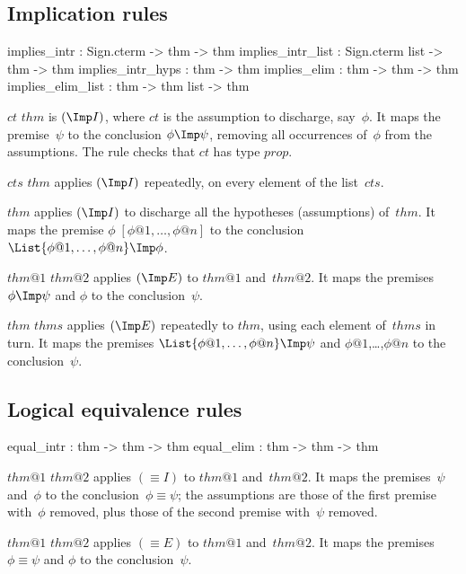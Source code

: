 \subsection{Implication rules}
\begin{ttbox} 
implies_intr      : Sign.cterm -> thm -> thm
implies_intr_list : Sign.cterm list -> thm -> thm
implies_intr_hyps : thm -> thm
implies_elim      : thm -> thm -> thm
implies_elim_list : thm -> thm list -> thm
\end{ttbox}
\begin{ttdescription}
\item[\ttindexbold{implies_intr} $ct$ $thm$] 
is $({\Imp}I)$, where $ct$ is the assumption to discharge, say~$\phi$.  It
maps the premise~$\psi$ to the conclusion $\phi\Imp\psi$, removing all
occurrences of~$\phi$ from the assumptions.  The rule checks that $ct$ has
type $prop$. 

\item[\ttindexbold{implies_intr_list} $cts$ $thm$] 
applies $({\Imp}I)$ repeatedly, on every element of the list~$cts$.

\item[\ttindexbold{implies_intr_hyps} $thm$] 
applies $({\Imp}I)$ to discharge all the hypotheses (assumptions) of~$thm$.
It maps the premise $\phi \; [\phi@1,\ldots,\phi@n]$ to the conclusion
$\List{\phi@1,\ldots,\phi@n}\Imp\phi$.

\item[\ttindexbold{implies_elim} $thm@1$ $thm@2$] 
applies $({\Imp}E)$ to $thm@1$ and~$thm@2$.  It maps the premises $\phi\Imp
\psi$ and $\phi$ to the conclusion~$\psi$.

\item[\ttindexbold{implies_elim_list} $thm$ $thms$] 
applies $({\Imp}E)$ repeatedly to $thm$, using each element of~$thms$ in
turn.  It maps the premises $\List{\phi@1,\ldots,\phi@n}\Imp\psi$ and
$\phi@1$,\ldots,$\phi@n$ to the conclusion~$\psi$.
\end{ttdescription}

\subsection{Logical equivalence rules}
\begin{ttbox} 
equal_intr : thm -> thm -> thm 
equal_elim : thm -> thm -> thm
\end{ttbox}
\begin{ttdescription}
\item[\ttindexbold{equal_intr} $thm@1$ $thm@2$] 
applies $({\equiv}I)$ to $thm@1$ and~$thm@2$.  It maps the premises~$\psi$
and~$\phi$ to the conclusion~$\phi\equiv\psi$; the assumptions are those of
the first premise with~$\phi$ removed, plus those of
the second premise with~$\psi$ removed.

\item[\ttindexbold{equal_elim} $thm@1$ $thm@2$] 
applies $({\equiv}E)$ to $thm@1$ and~$thm@2$.  It maps the premises
$\phi\equiv\psi$ and $\phi$ to the conclusion~$\psi$.
\end{ttdescription}


